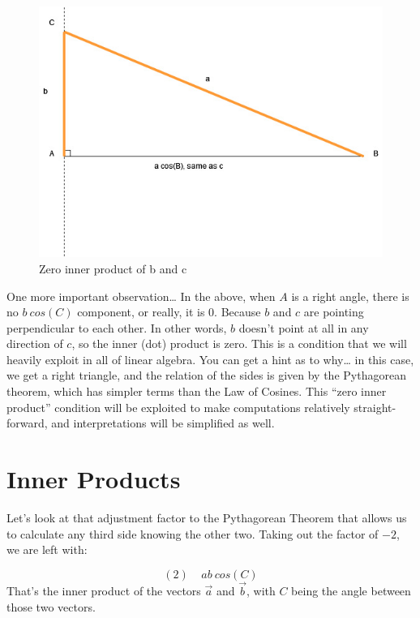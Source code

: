 \documentclass[
]{book}
\begin{document}
\begin{figure}

{\centering \includegraphics[width=0.75\linewidth,height=0.75\textheight]{images/Triangles-bcosA-rightTriangle} 

}

\caption{Zero inner product of b and c}\label{fig:unnamed-chunk-3}
\end{figure}

One more important observation\ldots{} In the above, when \(A\) is a right angle, there is no \(b\ cos(C)\) component, or really, it is 0. Because \(b\) and \(c\) are pointing perpendicular to each other. In other words, \(b\) doesn't point at all in any direction of \(c\), so the inner (dot) product is zero. This is a condition that we will heavily exploit in all of linear algebra. You can get a hint as to why\ldots{} in this case, we get a right triangle, and the relation of the sides is given by the Pythagorean theorem, which has simpler terms than the Law of Cosines. This ``zero inner product'' condition will be exploited to make computations relatively straight-forward, and interpretations will be simplified as well.

\hypertarget{inner-products}{%
\section{Inner Products}\label{inner-products}}

Let's look at that adjustment factor to the Pythagorean Theorem that allows us to calculate any third side knowing the other two. Taking out the factor of \(-2\), we are left with:

\[(2) \ \ \ \ \ a b \ cos(C)\]
That's the inner product of the vectors \(\vec{a}\) and \(\vec{b}\), with \(C\) being the angle between those two vectors.
\end{document}
